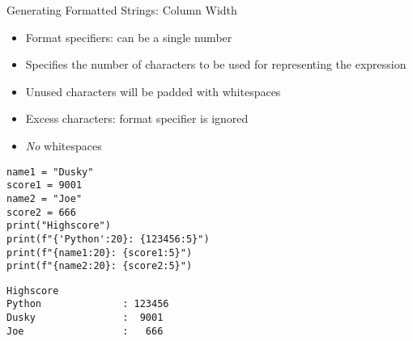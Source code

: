 
\begin{frame}[fragile]{Generating Formatted Strings: Column Width}
%
\begin{itemize}
\item Format specifiers: can be a single number
\item Specifies the number of characters to be used for representing the expression
\item Unused characters will be padded with whitespaces
\item Excess characters: format specifier is ignored
\item \emph{No} whitespaces
\end{itemize}
%
\begin{codebox}[Code: Format Strings (2), width=.49\linewidth, nobeforeafter, equal height group = grpFormatString2]
\begin{verbatim}
name1 = "Dusky"
score1 = 9001
name2 = "Joe"
score2 = 666
print("Highscore")
print(f"{'Python':20}: {123456:5}")
print(f"{name1:20}: {score1:5}")
print(f"{name2:20}: {score2:5}")
\end{verbatim}
\end{codebox}
%
\begin{cmdbox}[Output: Format Strings (2), width=.49\linewidth, nobeforeafter, equal height group = grpFormatString2]
\begin{verbatim}
Highscore
Python              : 123456
Dusky               :  9001
Joe                 :   666
\end{verbatim}
\end{cmdbox}
%
\end{frame}


